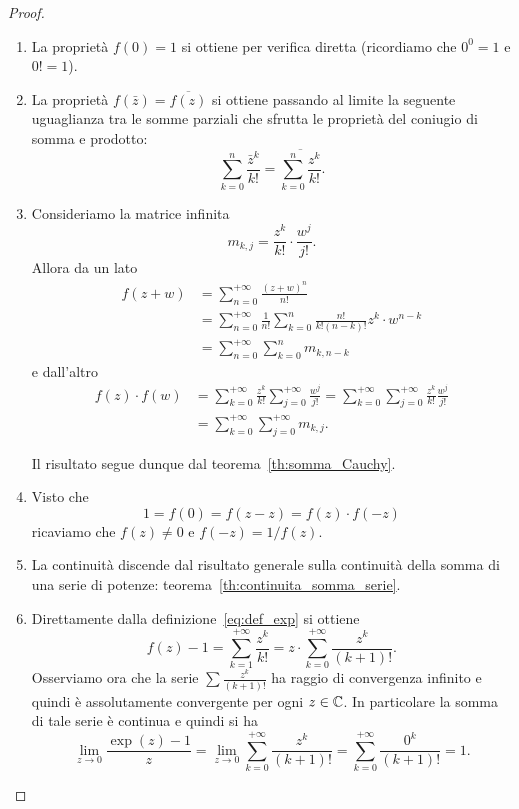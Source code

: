 \begin{proof}
\mymark{*}
\begin{enumerate}
\item
La proprietà $f(0)=1$ si ottiene per verifica diretta (ricordiamo che $0^0=1$
e $0!=1$).

\item La proprietà $f(\bar z) = \overline{f(z)}$ si ottiene
passando al limite la seguente uguaglianza tra le somme parziali
che sfrutta le proprietà del coniugio di somma e prodotto:
\[
\sum_{k=0}^{n} \frac{\bar z^k}{k!} = \overline{\sum_{k=0}^n \frac{z^k}{k!}}.
\]


\item
Consideriamo la matrice infinita
\[
m_{k,j}  = \frac{z^k}{k!} \cdot \frac{w^j}{j!}.
\]
Allora da un lato
\begin{align*}
 f(z+w)
 &= \sum_{n=0}^{+\infty} \frac{(z+w)^n}{n!}\\
 &= \sum_{n=0}^{+\infty} \frac{1}{n!}\sum_{k=0}^n \frac{n!}{k!(n-k)!} z^k\cdot w^{n-k}\\
 &= \sum_{n=0}^{+\infty} \sum_{k=0}^n m_{k, n-k}
\end{align*}
e dall'altro
\begin{align*}
 f(z) \cdot f(w)
 &= \sum_{k=0}^{+\infty}\frac{z^k}{k!} \sum_{j=0}^{+\infty}\frac{w^j}{j!}
 = \sum_{k=0}^{+\infty}\sum_{j=0}^{+\infty}\frac{z^k}{k!} \frac{w^j}{j!} \\
 &= \sum_{k=0}^{+\infty}\sum_{j=0}^{+\infty} m_{k,j}.
\end{align*}

Il risultato segue dunque dal teorema~\ref{th:somma_Cauchy}.

\item
Visto che
\[
  1 = f(0) = f(z-z) = f(z) \cdot f(-z)
\]
ricaviamo che $f(z)\neq 0$ e $f(-z) =  1 / f(z)$.

\item
La continuità discende dal risultato generale sulla continuità della
somma di una serie di potenze: teorema~\ref{th:continuita_somma_serie}.

\item
Direttamente dalla definizione~\eqref{eq:def_exp}
si ottiene
\[
 f(z) - 1 = \sum_{k=1}^{+\infty} \frac{z^k}{k!}
 = z \cdot \sum_{k=0}^{+\infty} \frac{z^k}{(k+1)!}.
\]
Osserviamo ora che la serie $\sum \frac{z^k}{(k+1)!}$ ha raggio di
convergenza infinito e quindi è assolutamente convergente per ogni $z\in {\mathbb C}$.
In particolare la somma di tale serie è continua e
quindi si ha
\[
\lim_{z\to 0}\frac{\exp(z) - 1}{z}
   =  \lim_{z\to 0} \sum_{k=0}^{+\infty} \frac{z^k}{(k+1)!}
   = \sum_{k=0}^{+\infty}\frac{0^k}{(k+1)!} = 1.
\]
\end{enumerate}
\end{proof}

